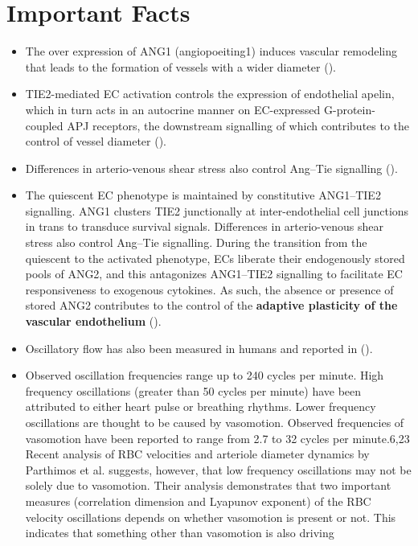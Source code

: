 \section{Important Facts}
\begin{itemize}
	\item The over expression of ANG1 (angiopoeiting1) induces vascular remodeling that leads to the formation of vessels with a wider diameter (\cite{Augustin2009}).
	\item  TIE2-mediated EC activation controls the expression of endothelial apelin, which in turn acts in an autocrine manner on EC-expressed G-protein-coupled APJ receptors, the downstream signalling of which contributes to the control of vessel diameter (\cite{Augustin2009,Kidoya2008}).
	\item  Differences in arterio-venous shear stress also control Ang–Tie signalling (\cite{Augustin2009}).
	\item The quiescent EC phenotype is maintained by constitutive ANG1–TIE2 signalling. ANG1 clusters TIE2 junctionally at inter-endothelial cell junctions in trans to transduce survival signals. Differences in arterio-venous shear stress also control Ang–Tie signalling. During the transition from the quiescent to the activated phenotype, ECs liberate their endogenously stored pools of ANG2, and this antagonizes ANG1–TIE2 signalling to facilitate EC responsiveness to exogenous cytokines. As such, the absence or presence of stored ANG2 contributes to the control of the \textbf{adaptive plasticity of the vascular endothelium} (\cite{Augustin2009}).
	\item  Oscillatory flow has also been measured in humans and reported in \cite{Rodgers1984} (\cite{Carr2005}).
	\item Observed oscillation frequencies range up to 240 cycles per minute. High frequency oscillations (greater than 50 cycles per minute) have been attributed to either heart pulse or breathing rhythms. Lower frequency oscillations are thought to be caused by vasomotion. Observed frequencies of vasomotion have been reported to range from 2.7 to 32 cycles per minute.6,23 Recent analysis of RBC velocities and arteriole diameter dynamics by Parthimos et al. suggests, however, that low frequency oscillations may not be solely due to vasomotion. Their analysis demonstrates that two important measures (correlation dimension
	and Lyapunov exponent) of the RBC velocity oscillations
	depends on whether vasomotion is present or not. This indicates that something other than vasomotion is also driving

\end{itemize}
